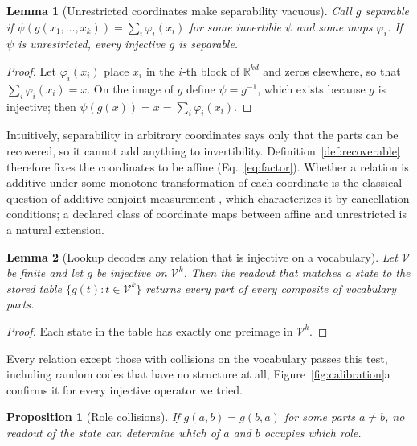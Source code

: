 \documentclass[10pt]{article}
\theoremstyle{plain}
\newtheorem{proposition}{Proposition}
\newtheorem{lemma}{Lemma}
\theoremstyle{remark}
\newcommand{\R}{\mathbb{R}}
\newcommand{\Voc}{\mathcal{V}}
\begin{document}
\begin{lemma}[Unrestricted coordinates make separability vacuous]
\label{lem:psi}
Call $g$ separable if $\psi(g(x_1, \ldots, x_k)) = \sum_i \varphi_i(x_i)$ for some invertible $\psi$ and some maps $\varphi_i$. If $\psi$ is unrestricted, every injective $g$ is separable.
\end{lemma}

\begin{proof}
Let $\varphi_i(x_i)$ place $x_i$ in the $i$-th block of $\R^{kd}$ and zeros elsewhere, so that $\sum_i \varphi_i(x_i) = x$. On the image of $g$ define $\psi = g^{-1}$, which exists because $g$ is injective; then $\psi(g(x)) = x = \sum_i \varphi_i(x_i)$.
\end{proof}

\noindent
Intuitively, separability in arbitrary coordinates says only that the parts can be recovered, so it cannot add anything to invertibility. Definition~\ref{def:recoverable} therefore fixes the coordinates to be affine (Eq.~\ref{eq:factor}). Whether a relation is additive under some monotone transformation of each coordinate is the classical question of additive conjoint measurement \citep{luce1964}, which characterizes it by cancellation conditions; a declared class of coordinate maps between affine and unrestricted is a natural extension.

\begin{lemma}[Lookup decodes any relation that is injective on a vocabulary]
\label{lem:lookup}
Let $\Voc$ be finite and let $g$ be injective on $\Voc^k$. Then the readout that matches a state to the stored table $\{g(t) : t \in \Voc^k\}$ returns every part of every composite of vocabulary parts.
\end{lemma}

\begin{proof}
Each state in the table has exactly one preimage in $\Voc^k$.
\end{proof}

\noindent
Every relation except those with collisions on the vocabulary passes this test, including random codes that have no structure at all; Figure~\ref{fig:calibration}a confirms it for every injective operator we tried.

\begin{proposition}[Role collisions]
\label{prop:blend}
If $g(a, b) = g(b, a)$ for some parts $a \neq b$, no readout of the state can determine which of $a$ and $b$ occupies which role.
\end{proposition}
\end{document}
